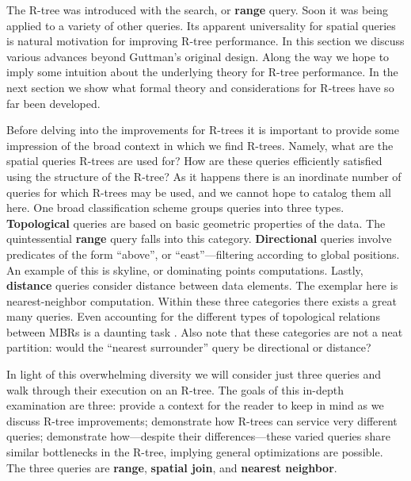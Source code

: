 \newcommand{\keyword}[1]{\textbf{#1}}

The R-tree was introduced with the search, or \keyword{range} query.
Soon it was being applied to a variety of other queries.
Its apparent universality for spatial queries is natural motivation for improving R-tree performance.
In this section we discuss various advances beyond Guttman's original design.
Along the way we hope to imply some intuition about the underlying theory for R-tree performance.
In the next section we show what formal theory and considerations for R-trees have so far been developed.

Before delving into the improvements for R-trees it is important to provide some impression of the broad context in which we find R-trees.
Namely, what are the spatial queries R-trees are used for?
How are these queries efficiently satisfied using the structure of the R-tree?
As it happens there is an inordinate number of queries for which R-trees may be used, and we cannot hope to catalog them all here.
One broad classification scheme groups queries into three types.
\keyword{Topological} queries are based on basic geometric properties of the data.
The quintessential \keyword{range} query falls into this category.
\keyword{Directional} queries involve predicates of the form ``above'', or ``east''---filtering according to global positions.
An example of this is skyline, or dominating points computations.
Lastly, \keyword{distance} queries consider distance between data elements.
The exemplar here is nearest-neighbor computation.
Within these three categories there exists a great many queries.
Even accounting for the different types of topological relations between MBRs is a daunting task \cite{papadiassellistheodoridisegenhofer95}.
Also note that these categories are not a neat partition: would the ``nearest surrounder'' query be directional or distance?

In light of this overwhelming diversity we will consider just three queries and walk through their execution on an R-tree.
The goals of this in-depth examination are three:
provide a context for the reader to keep in mind as we discuss R-tree improvements;
demonstrate how R-trees can service very different queries;
demonstrate how---despite their differences---these varied queries share similar bottlenecks in the R-tree, implying general optimizations are possible.
The three queries are \keyword{range}, \keyword{spatial join}, and \keyword{nearest neighbor}.

